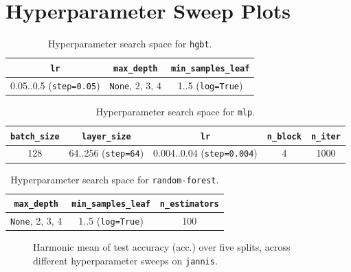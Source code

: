 \documentclass{article}
\begin{document}
\clearpage
\printbibliography

\clearpage
\appendix

\section{Hyperparameter Sweep Plots}
\label{sec:hyperparams_sweep_plots}

\begin{table}[htbp]
  \centering
  \caption{Hyperparameter search space for \texttt{hgbt}.}
  \label{tab:hyperparams_spaces_hgbt}
  \small
  \begin{tabular}{ccc}
    \toprule
    \texttt{lr} & \texttt{max\_depth} & \small\texttt{min\_samples\_leaf} \\
    \midrule
    0.05..0.5 (\texttt{step=0.05})
    & \texttt{None}, 2, 3, 4
    & 1..5 (\texttt{log=True}) \\
    \bottomrule
  \end{tabular}
\end{table}

\begin{table}[htbp]
  \centering
  \caption{Hyperparameter search space for \texttt{mlp}.}
  \label{tab:hyperparams_spaces_mlp}
  \small
  \begin{tabular}{ccccc}
    \toprule
    \texttt{batch\_size} & \texttt{layer\_size} & \texttt{lr} & \texttt{n\_block} & \texttt{n\_iter} \\
    \midrule
    128
    & 64..256 (\texttt{step=64})
    & 0.004..0.04 (\texttt{step=0.004})
    & 4
    & 1000 \\
    \bottomrule
  \end{tabular}
\end{table}

\begin{table}[htbp]
  \centering
  \caption{Hyperparameter search space for \texttt{random-forest}.}
  \label{tab:hyperparams_spaces_random_forest}
  \small
  \begin{tabular}{ccc}
    \toprule
    \texttt{max\_depth} & \small\texttt{min\_samples\_leaf} & \texttt{n\_estimators} \\
    \midrule
    \texttt{None}, 2, 3, 4 & 1..5 (\texttt{log=True}) & 100 \\
    \bottomrule
  \end{tabular}
\end{table}

\begin{figure}[htbp]
  \centering
  
  
  
  \caption{
    Harmonic mean of test accuracy (acc.) over five splits, across different
    hyperparameter sweeps on \texttt{jannis}.
  }
  \label{fig:sweep_pareto_jannis}
\end{figure}
\end{document}
